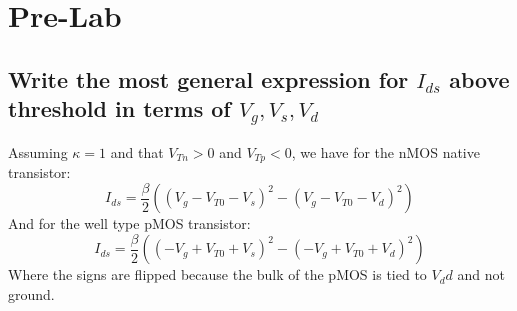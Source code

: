 


\newpage
\section{Pre-Lab}
\subsection{Write the most general expression for \(I_{ds}\) above threshold in terms of \(V_g,V_s,V_d\)}
Assuming \(\kappa=1\) and that \(V_{Tn} > 0\) and \(V_{Tp} < 0\), we have for the nMOS native transistor:
\begin{equation*}
    I_{ds} = \frac{\beta}{2}\left(\left(V_g-V_{T0}-V_s\right)^2-\left(V_g-V_{T0} - V_d\right)^2\right)
\end{equation*}
And for the well type pMOS transistor:
\begin{equation*}
    I_{ds} = \frac{\beta}{2}\left(\left(-V_g+V_{T0}+V_s\right)^2-\left(-V_g+V_{T0} + V_d\right)^2\right)
\end{equation*}
Where the signs are flipped because the bulk of the pMOS is tied to \(V_dd\) and not ground.

